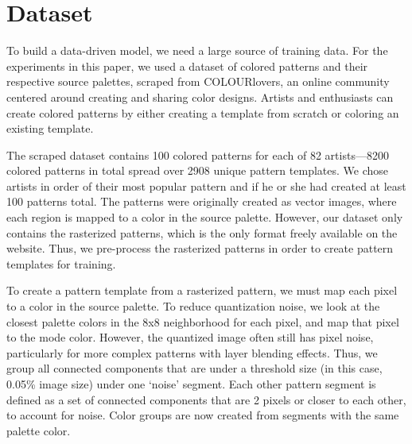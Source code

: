\section{Dataset}
\label{sec:dataset}

To build a data-driven model, we need a large source of training data. For the experiments in this paper, we used a dataset of colored patterns and their respective source palettes, scraped from COLOURlovers, an online community centered around creating and sharing color designs. Artists and enthusiasts can create colored patterns by either creating a template from scratch or coloring an existing template. 

The scraped dataset contains 100 colored patterns for each of 82 artists---8200 colored patterns in total spread over 2908 unique pattern templates. We chose artists in order of their most popular pattern and if he or she had created at least 100 patterns total. The patterns were originally created as vector images, where each region is mapped to a color in the source palette. However, our dataset only contains the rasterized patterns, which is the only format freely available on the website. Thus, we pre-process the rasterized patterns in order to create pattern templates for training.

To create a pattern template from a rasterized pattern, we must map each pixel to a color in the source palette. To reduce quantization noise, we look at the closest palette colors in the 8x8 neighborhood for each pixel, and map that pixel to the mode color. However, the quantized image often still has pixel noise, particularly for more complex patterns with layer blending effects. Thus, we group all connected components that are under a threshold size (in this case, 0.05\% image size) under one `noise' segment. Each other pattern segment is defined as a set of connected components that are 2 pixels or closer to each other, to account for noise. Color groups are now created from segments with the same palette color.


